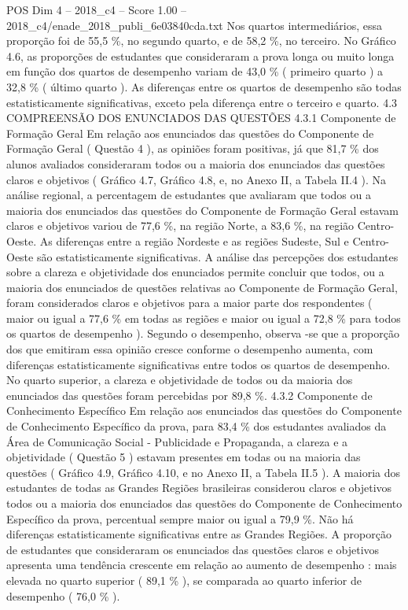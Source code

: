 \begin{textsample}{POS Dim 4 – 2018\_c4 – Score 1.00 – 2018\_c4/enade\_2018\_publi\_6e03840cda.txt}
Nos quartos intermediários, essa proporção foi de 55,5 \%, no segundo quarto, e de 58,2 \%, no terceiro.
No Gráfico 4.6, as proporções de estudantes que consideraram a prova longa ou muito longa em função dos quartos de desempenho variam de 43,0 \% ( primeiro quarto ) a 32,8 \% ( último quarto ).
As diferenças entre os quartos de desempenho são todas estatisticamente significativas, exceto pela diferença entre o terceiro e quarto. 4.3 COMPREENSÃO DOS ENUNCIADOS DAS QUESTÕES 4.3.1 Componente de Formação Geral Em relação aos enunciados das questões do Componente de Formação Geral ( Questão 4 ), as opiniões foram positivas, já que 81,7 \% dos alunos avaliados consideraram todos ou a maioria dos enunciados das questões claros e objetivos ( Gráfico 4.7, Gráfico 4.8, e, no Anexo II, a Tabela II.4 ).
Na análise regional, a percentagem de estudantes que avaliaram que todos ou a maioria dos enunciados das questões do Componente de Formação Geral estavam claros e objetivos variou de 77,6 \%, na região Norte, a 83,6 \%, na região Centro-Oeste.
As diferenças entre a região Nordeste e as regiões Sudeste, Sul e Centro-Oeste são estatisticamente significativas.
A análise das percepções dos estudantes sobre a clareza e objetividade dos enunciados permite concluir que todos, ou a maioria dos enunciados de questões relativas ao Componente de Formação Geral, foram considerados claros e objetivos para a maior parte dos respondentes ( maior ou igual a 77,6 \% em todas as regiões e maior ou igual a 72,8 \% para todos os quartos de desempenho ).
Segundo o desempenho, observa -se que a proporção dos que emitiram essa opinião cresce conforme o desempenho aumenta, com diferenças estatisticamente significativas entre todos os quartos de desempenho.
No quarto superior, a clareza e objetividade de todos ou da maioria dos enunciados das questões foram percebidas por 89,8 \%. 4.3.2 Componente de Conhecimento Específico Em relação aos enunciados das questões do Componente de Conhecimento Específico da prova, para 83,4 \% dos estudantes avaliados da Área de Comunicação Social - Publicidade e Propaganda, a clareza e a objetividade ( Questão 5 ) estavam presentes em todas ou na maioria das questões ( Gráfico 4.9, Gráfico 4.10, e no Anexo II, a Tabela II.5 ).
A maioria dos estudantes de todas as Grandes Regiões brasileiras considerou claros e objetivos todos ou a maioria dos enunciados das questões do Componente de Conhecimento Específico da prova, percentual sempre maior ou igual a 79,9 \%.
Não há diferenças estatisticamente significativas entre as Grandes Regiões.
A proporção de estudantes que consideraram os enunciados das questões claros e objetivos apresenta uma tendência crescente em relação ao aumento de desempenho : mais elevada no quarto superior ( 89,1 \% ), se comparada ao quarto inferior de desempenho ( 76,0 \% ).

\end{textsample}
